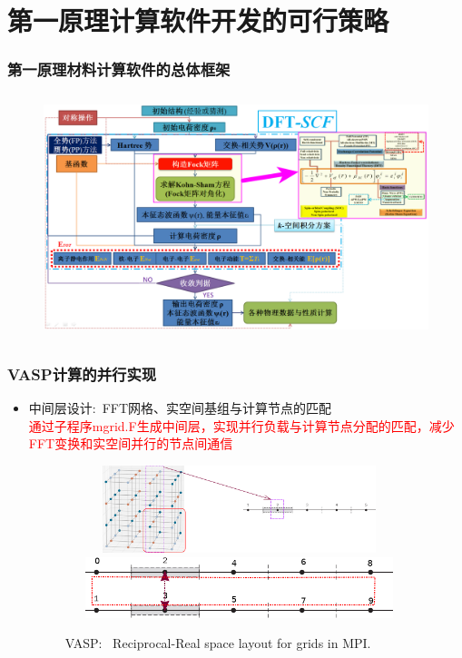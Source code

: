 \documentclass[cjk,slidestop,compress,mathserif,blue]{beamer}
\begin{document}
\section{第一原理计算软件开发的可行策略}
\frame
{
	\frametitle{第一原理材料计算软件的总体框架}
\begin{figure}[h!]
\centering
\vspace*{-0.25in}
\hspace*{-0.80in}
\includegraphics[height=2.80in,width=4.95in,viewport=5 3 1490 870,clip]{Figures/DFT-SCF_2.png}
\label{DFT-SCF-2}
\end{figure}
}

\frame
{
	\frametitle{\textrm{VASP}计算的并行实现}
	\begin{itemize}
	     \item 中间层设计:~\textrm{FFT}网格、实空间基组与计算节点的匹配\\
		     \textcolor{red}{通过子程序\textrm{mgrid.F}生成中间层，实现并行负载与计算节点分配的匹配，减少\textrm{FFT}变换和实空间并行的节点间通信}
\begin{figure}[h!]
		\vspace{-0.25in}
	\centering
\includegraphics[height=1.0in,width=4.0in,viewport=0 0 1500 450,clip]{Figures/VASP_FFT-MPI_Reciprocal.png}
\vskip 0.5pt
\includegraphics[height=0.7in,width=4.0in,viewport=0 0 730 150,clip]{Figures/VASP_FFT-MPI_Real.png}
\caption{\tiny \textrm{VASP:~ Reciprocal-Real space layout for grids in MPI.}}%
\label{MPI-FFT}
\end{figure} 
	\end{itemize}
}
\end{document}
